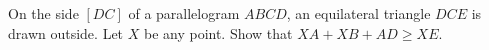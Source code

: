 On the side $[DC]$ of a parallelogram $ABCD$, an equilateral triangle $DCE$ is drawn outside. Let $X$ be any point. Show that $XA + XB + AD \geq XE$.
